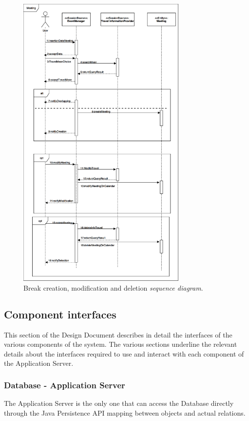 \documentclass{article}
\begin{document}
	\begin{figure}[!ht]
	\centering
	\includegraphics[width=0.75\textwidth]{img/diagrams/sd_break.png}
	\caption{Break creation, modification and deletion \textit{sequence diagram}.}
	\end{figure}


	\newpage
	\subsection{Component interfaces}
	
	This section of the Design Document describes in detail the interfaces of the various components of the system. The various sections underline the relevant details about the interfaces required to use and interact with each component of the Application Server.

	\subsubsection{Database - Application Server}
	The Application Server is the only one that can access the Database directly through the Java Persistence API mapping between objects and actual relations.
\end{document}
